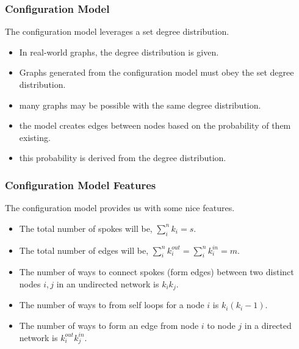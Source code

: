 \documentclass{beamer}
\newcommand{\ds}{\displaystyle}
\begin{document}
\begin{frame}

    \frametitle{Configuration Model}

    The configuration model leverages a set degree distribution.\pause

    \vspace{2.5mm}
    \begin{itemize}
        \item In real-world graphs, the degree distribution is given.\pause
        \item Graphs generated from the configuration model must obey the set degree distribution.\pause
        \item[$\diamond$] many graphs may be possible with the same degree distribution.\pause
        \item[$\diamond$] the model creates edges between nodes based on the probability of them existing.\pause
        \item[$\ast$] this probability is derived from the degree distribution.
    \end{itemize}

\end{frame}

\begin{frame}

    \frametitle{Configuration Model Features}

    The configuration model provides us with some nice features.\pause

    \vspace{2.5mm}
    \begin{itemize}
        \item The total number of spokes will be, $ \ds \sum_{i}^{n} k_{i} = s $.\pause
        \item The total number of edges will be, $ \ds \sum_{i}^{n} k_{i}^{out} = \sum_{i}^{n} k_{i}^{in} = m $.\pause
        \item The number of ways to connect spokes (form edges) between two distinct nodes $ i,j $ in an undirected network is $ \ds k_{i} k_{j} $.\pause
        \item The number of ways to from self loops for a node $ i $ is $ \ds k_{i}(k_{i} - 1) $. \pause
        \item The number of ways to form an edge from node $ i $ to node $ j $ in a directed network is $ \ds k_{i}^{out} k_{j}^{in} $.
    \end{itemize}


\end{frame}
\end{document}

